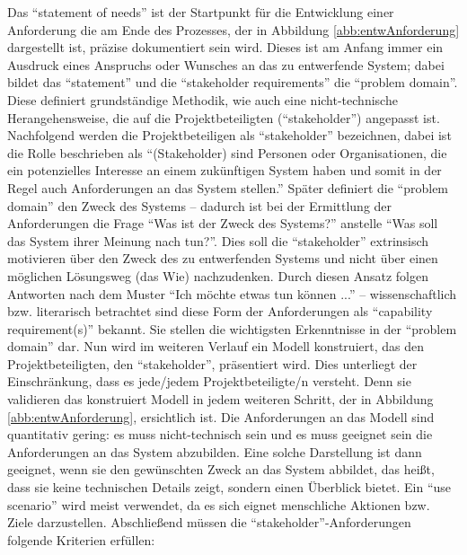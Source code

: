Das \enquote{statement of needs} ist der Startpunkt für die Entwicklung einer Anforderung die am Ende des Prozesses, der in Abbildung \vref{abb:entwAnforderung} dargestellt ist, präzise dokumentiert sein wird. Dieses ist am Anfang immer ein Ausdruck eines Anspruchs oder Wunsches an das zu entwerfende System; dabei bildet das \enquote{statement} und die \enquote{stakeholder requirements} die \enquote{problem domain}. Diese definiert grundständige Methodik, wie auch eine nicht-technische Herangehensweise, die auf die Projektbeteiligten (\enquote{stakeholder}) angepasst ist. Nachfolgend werden die Projektbeteiligen als \enquote{stakeholder} bezeichnen, dabei ist die Rolle beschrieben als \enquote{(Stakeholder) sind Personen oder Organisationen, die ein potenzielles Interesse an einem zukünftigen System haben und somit in der Regel auch Anforderungen an das System stellen.}\autocite[][S.\,8]{partsch_requirements-engineering_2010} Später definiert die \enquote{problem domain} den Zweck des Systems -- dadurch ist bei der Ermittlung der Anforderungen die Frage \enquote{Was ist der Zweck des Systems?} anstelle \enquote{Was soll das System ihrer Meinung nach tun?}. Dies soll die \enquote{stakeholder} extrinsisch motivieren über den Zweck des zu entwerfenden Systems und nicht über einen möglichen Lösungsweg (das Wie) nachzudenken. Durch diesen Ansatz folgen Antworten nach dem Muster \enquote{Ich möchte etwas tun können ...} -- wissenschaftlich bzw. literarisch betrachtet sind diese Form der Anforderungen als \enquote{capability requirement(s)}\autocite[vgl.][S.\,94]{hull_requirements_2011} bekannt. Sie stellen die wichtigsten Erkenntnisse in der \enquote{problem domain} dar. Nun wird im weiteren Verlauf ein Modell konstruiert, das den Projektbeteiligten, den \enquote{stakeholder}, präsentiert wird. Dies unterliegt der Einschränkung, dass es jede/jedem Projektbeteiligte/n versteht. Denn sie validieren das konstruiert Modell in jedem weiteren Schritt, der in Abbildung \vref{abb:entwAnforderung}, ersichtlich ist. Die Anforderungen an das Modell sind quantitativ gering: es muss nicht-technisch sein und es muss geeignet sein die Anforderungen an das System abzubilden. Eine solche Darstellung ist dann geeignet, wenn sie den gewünschten Zweck an das System abbildet, das heißt, dass sie keine technischen Details zeigt, sondern einen Überblick bietet. Ein \enquote{use scenario}\autocite[vgl.][S.\,94]{hull_requirements_2011} wird meist verwendet, da es sich eignet menschliche Aktionen bzw. Ziele darzustellen. Abschließend müssen die \enquote{stakeholder}-Anforderungen folgende Kriterien erfüllen: 

